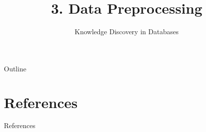 \documentclass[aspectratio=169,t]{beamer}
\title[KDD~3.~Data Preprocessing]{3. Data Preprocessing} %
\subtitle{Knowledge Discovery in Databases}
\begin{document}

  \maketitle

  { %
    \begin{frame}[noframenumbering]{Outline}
      \tableofcontents

    \end{frame}
  }

  
  
  
  
  
  

  \section*{References}
  \begin{frame}{References}
    \nocite{cleveland1993,dasu2003,fayyad2001,kaufman1990,dataReductionIssue1997,keim2002,naumann2013,pyle1999,santini1999,tufte2001,yu2009}
    \printbibliography
  \end{frame}
\end{document}
